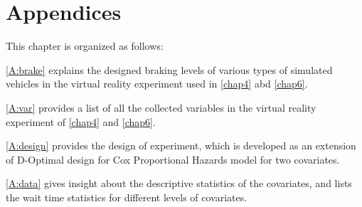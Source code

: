 \chapter*{Appendices}
This chapter is organized as follows:

\cref{A:brake} explains the designed braking levels of various types of simulated vehicles in the virtual reality experiment used in \cref{chap4} abd \cref{chap6}.

\cref{A:var} provides a list of all the collected variables in the virtual reality experiment of \cref{chap4} and \cref{chap6}.

\cref{A:design} provides the design of experiment, which is developed as an extension of D-Optimal design for Cox Proportional Hazards model for two covariates.

\cref{A:data} gives insight about the descriptive statistics of the covariates, and lists the wait time statistics for different levels of covariates.


\clearpage